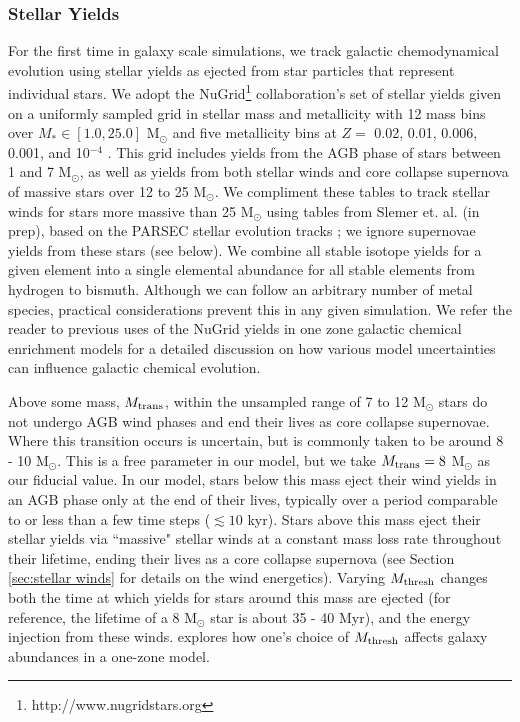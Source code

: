 \documentclass[twocolumn]{aastex61}
\begin{document}
\subsubsection{Stellar Yields}
\label{sec:yields}
For the first time in galaxy scale simulations, we track galactic chemodynamical evolution using stellar yields as ejected from star particles that represent individual stars. We adopt the NuGrid\footnote{http://www.nugridstars.org} collaboration's set of stellar yields given on a uniformly sampled grid in stellar mass and metallicity with 12 mass bins over $M_{*} \in \left[1.0, 25.0\right]$ M$_{\odot}$ and five metallicity bins at $Z =$ 0.02, 0.01, 0.006, 0.001, and 10$^{-4}$ \citep{Pignatari2016, Ritter2017}. This grid includes yields from the AGB phase of stars between 1 and 7 M$_{\odot}$, as well as yields from both stellar winds and core collapse supernova of massive stars over 12 to 25 M$_{\odot}$. We compliment these tables to track stellar winds for stars more massive than 25 M$_{\odot}$ using tables from Slemer et. al. (in prep), based on the PARSEC stellar evolution tracks \citep{Bressan2012, Tang2014}; we ignore supernovae yields from these stars (see below). We combine all stable isotope yields for a given element into a single elemental abundance for all stable elements from hydrogen to bismuth. Although we can follow an arbitrary number of metal species, practical considerations prevent this in any given simulation. We refer the reader to previous uses of the NuGrid yields in one zone galactic chemical enrichment models \citep{Cote2016,  Cote2016_feb,Cote2017} for a detailed discussion on how various model uncertainties can influence galactic chemical evolution.

Above some mass, $M_{\rm trans}$, within the unsampled range of 7 to 12 M$_{\odot}$ stars do not undergo AGB wind phases and end their lives as core collapse supernovae. Where this transition occurs is uncertain, but is commonly taken to be around 8 - 10 M$_{\odot}$. This is a free parameter in our model, but we take $M_{\rm trans} = 8$ M$_{\odot}$ as our fiducial value. In our model, stars below this mass eject their wind yields in an AGB phase only at the end of their lives, typically over a period comparable to or less than a few time steps ($\lesssim 10$ kyr). Stars above this mass eject their stellar yields via ``massive" stellar winds at a constant mass loss rate throughout their lifetime, ending their lives as a core collapse supernova (see Section \ref{sec:stellar winds} for details on the wind energetics). Varying $M_{\rm thresh}$ changes both the time at which yields for stars around this mass are ejected (for reference, the lifetime of a 8 M$_{\odot}$ star is about 35 - 40 Myr), and the energy injection from these winds. \citet{Cote2017} explores how one's choice of $M_{\rm thresh}$ affects galaxy abundances in a one-zone model.
\end{document}
